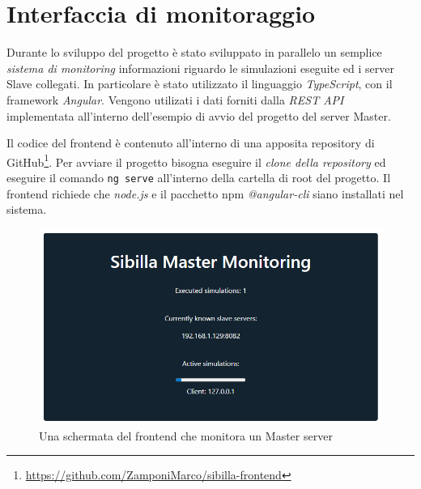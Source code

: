 \section{Interfaccia di monitoraggio}
Durante lo sviluppo del progetto è stato sviluppato in parallelo un semplice \emph{sistema di monitoring} informazioni riguardo le simulazioni eseguite ed i server Slave collegati. In particolare è stato utilizzato il linguaggio \emph{TypeScript}, con il framework \emph{Angular}. Vengono utilizati i dati forniti dalla \emph{REST API} implementata all'interno dell'esempio di avvio del progetto del server Master.

Il codice del frontend è contenuto all'interno di una apposita repository di GitHub\footnote{\url{https://github.com/ZamponiMarco/sibilla-frontend}}. Per avviare il progetto bisogna eseguire il \emph{clone della repository} ed eseguire il comando \texttt{ng serve} all'interno della cartella di root del progetto. Il frontend richiede che \emph{node.js} e il pacchetto npm \emph{@angular-cli} siano installati nel sistema.

\begin{figure}[H]
    \includegraphics[width=\linewidth]{images/monitoring_frontend.PNG}
    \captionsetup{justification=centering}
    \caption{Una schermata del frontend che monitora un Master server}
\end{figure}